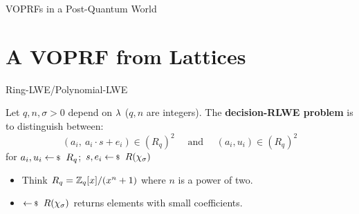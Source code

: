 \documentclass[xcolor=table,10pt,aspectratio=169]{beamer}
\begin{document}
\begin{frame}[label={sec:orgc898ee1}]{VOPRFs in a Post-Quantum World}
\begin{center}
\end{center}
\end{frame}

\section{A VOPRF from Lattices}
\label{sec:org09684cf}

\begin{frame}[label={sec:org59a6efc}]{Ring-LWE/Polynomial-LWE}
\begin{definition}
  Let \(q,n,\sigma> 0\) depend on \(\lambda\) (\(q,n\) are integers). The \textbf{decision-RLWE problem} is to distinguish between:
  \[
  {(a_i,\ a_i \cdot s +e_i)} \in {(R_q)}^2\quad \text{ and }\quad  {(a_i,u_i)} \in {(R_q)}^2
  \]
  for \(a_i,u_i \sample R_q\); \(s,e_i \sample R(\chi_\sigma)\)
\end{definition}

\begin{itemize}
\item Think \(R_q = \mathbb{Z}_q[x]/(x^n+1)\) where \(n\) is a power of two.
\item \(\sample R(\chi_\sigma)\) returns elements with small coefficients.
\end{itemize}
\end{frame}
\end{document}
